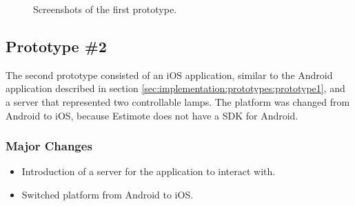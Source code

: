 \begin{figure}[!htb]%
    \centering
    \caption{Screenshots of the first prototype.}
    \label{fig:prototype1-app-screenshots}
\end{figure}

\FloatBarrier
\subsection{Prototype \#2}
\label{sec:implementation:prototypes:prototype2}

The second prototype consisted of an iOS application, 
similar to the Android application described in section \ref{sec:implementation:prototypes:prototype1}, 
and a server that represented two controllable lamps.
The platform was changed from Android to iOS, 
because Estimote does not have a SDK for Android.

\subsubsection{Major Changes}
\begin{itemize}
    \item Introduction of a server for the application to interact with.
    \item Switched platform from Android to iOS.
\end{itemize}

